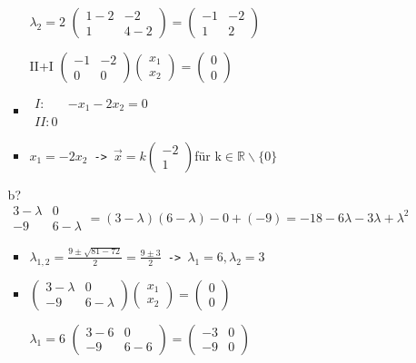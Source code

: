 \documentclass{article}
\newcommand{\R}{\mathbb{R}}
\begin{document}
\begin{itemize}
\begin{itemize}
\begin{itemize}
				\item[$\lambda_2=2$]{$\begin{pmatrix} 1-2 & -2 \\ 1 & 4-2 \end{pmatrix}=\begin{pmatrix} -1 & -2 \\ 1 & 2 \end{pmatrix}$}
				\item[II+I]{$\begin{pmatrix} -1 & -2 \\ 0 & 0 \end{pmatrix}\begin{pmatrix} x_1 \\ x_2 \end{pmatrix}=\begin{pmatrix} 0 \\ 0 \end{pmatrix}$}
				\item{$\begin{matrix} I: & -x_1-2x_2=0 \\ II: 0 \end{matrix}$}
				\item{$x_1=-2x_2$\texttt{ -> }$\vec{x}=k \begin{pmatrix} -2 \\ 1 \end{pmatrix}$für k$\in\R\backslash\{0\}$}
			\end{itemize}
			\item[b?]{$\begin{matrix} 3-\lambda & 0 \\ -9 & 6-\lambda \end{matrix}=(3-\lambda)(6-\lambda)-0+(-9)=-18-6\lambda-3\lambda+\lambda^2$}
			\begin{itemize}
				\item{$\lambda_{1,2}=\frac{9\pm\sqrt{81-72}}{2}=\frac{9\pm3}{2}$\texttt{ -> }$\lambda_1=6, \lambda_2=3$}
				\item{$\begin{pmatrix} 3-\lambda & 0 \\ -9 & 6-\lambda \end{pmatrix}\begin{pmatrix} x_1 \\ x_2 \end{pmatrix}=\begin{pmatrix} 0 \\ 0 \end{pmatrix}$}
				\item[$\lambda_1=6$]{$\begin{pmatrix} 3-6 & 0 \\ -9 & 6-6 \end{pmatrix}=\begin{pmatrix} -3 & 0 \\ -9 & 0 \end{pmatrix}$}

\end{itemize}
\end{itemize}
\end{itemize}
\end{document}
